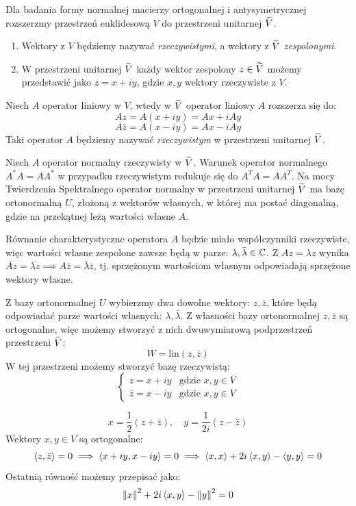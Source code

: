 Dla badania formy normalnej macierzy ortogonalnej i antysymetrycznej rozszerzmy przestrzeń euklidesową $V$ do przestrzeni unitarnej $\widetilde{V}$.

\begin{enumerate}[leftmargin=1cm, itemsep=2pt, label=(\arabic*)]
    \item Wektory z $V$ będziemy nazywać \textit{rzeczywistymi}, a wektory z $\widetilde{V}$ \textit{zespolonymi}.
    \item W przestrzeni unitarnej $\widetilde{V}$ każdy wektor zespolony $z \in \widetilde{V}$ możemy przedstawić jako $z = x + iy$, gdzie $x, y$ wektory rzeczywiste z $V$.
\end{enumerate}

Niech $A$ operator liniowy w $V$, wtedy w $\widetilde{V}$ operator liniowy $A$ rozszerza się do:
$$ Az = A(x + iy) = Ax + iAy$$
$$ A\bar{z} = A(x - iy) = Ax - iAy$$
Taki operator $A$ będziemy nazywać \textit{rzeczywistym} w przestrzeni unitarnej $\widetilde{V}$.

Niech $A$ operator normalny rzeczywisty w $\widetilde{V}$. Warunek operator normalnego $A^*A = AA^*$ w przypadku rzeczywistym redukuje się do $A^TA = AA^T$. Na mocy Twierdzenia Spektralnego operator normalny w przestrzeni unitarnej $\widetilde{V}$ ma bazę ortonormalną $U$, złożoną z wektorów własnych, w której ma postać diagonalną, gdzie na przekątnej leżą wartości własne $A$. 

Równanie charakterystyczne operatora $A$ będzie miało współczynniki rzeczywiste\cite[s. 22--23]{jeffrey2006}, więc wartości własne zespolone zawsze będą w parze: $\lambda, \bar{\lambda} \in \mathbb{C}$. Z $Az = \lambda z $ wynika $\overline{Az} = \overline{\lambda z} \implies  A\bar{z} = \bar{\lambda}\bar{z}$, tj. sprzężonym wartościom własnym odpowiadają sprzężone wektory własne.

Z bazy ortonormalnej $U$ wybierzmy dwa dowolne wektory: $z, \bar{z}$, które będą odpowiadać parze wartości własnych: $\lambda, \bar{\lambda}$. Z własności bazy ortonormalnej $z, \bar{z}$ są ortogonalne, więc możemy stworzyć z nich dwuwymiarową podprzestrzeń przestrzeni $\widetilde{V}$:
$$ W = \mathrm{lin}(z, \bar{z}) $$
W tej przestrzeni możemy stworzyć bazę rzeczywistą:
\[
\begin{cases}
z = x + iy & \text{gdzie } x, y \in V \\
\bar{z} = x - iy & \text{gdzie } x, y \in V
\end{cases}
\]

$$ x = \frac{1}{2}(z + \bar{z}), \quad y = \frac{1}{2i}(z - \bar{z})$$
Wektory $x, y \in V$ są ortogonalne:
$$ \left\langle z, \bar{z} \right\rangle = 0 \implies \left\langle x + iy, x - iy \right\rangle = 0 \implies \left\langle x, x \right\rangle + 2i\left\langle x, y \right\rangle - \left\langle y, y \right\rangle = 0 $$
Ostatnią równość możemy przepisać jako:
$$\left\| x \right\|^2 + 2i\left\langle x, y \right\rangle - \left\| y \right\|^2 = 0$$

